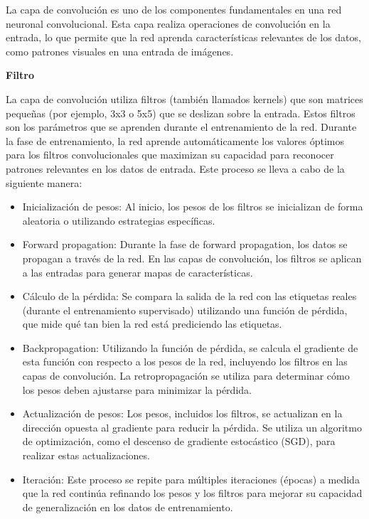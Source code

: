 La capa de convolución es uno de los componentes fundamentales en una red neuronal convolucional. Esta capa realiza operaciones de convolución en la entrada, lo que permite que la red aprenda características relevantes de los datos, como patrones visuales en una entrada de imágenes.

\textbf{Filtro}

La capa de convolución utiliza filtros (también llamados kernels) que son matrices pequeñas (por ejemplo, 3x3 o 5x5) que se deslizan sobre la entrada. Estos filtros son los parámetros que se aprenden durante el entrenamiento de la red. Durante la fase de entrenamiento, la red aprende automáticamente los valores óptimos para los filtros convolucionales que maximizan su capacidad para reconocer patrones relevantes en los datos de entrada. Este proceso se lleva a cabo de la siguiente manera:
 
 \begin{itemize}
	\item Inicialización de pesos: Al inicio, los pesos de los filtros se inicializan de forma aleatoria o utilizando estrategias específicas.
	
	\item Forward propagation: Durante la fase de forward propagation, los datos se propagan a través de la red. En las capas de convolución, los filtros se aplican a las entradas para generar mapas de características. 
	
	\item Cálculo de la pérdida: Se compara la salida de la red con las etiquetas reales (durante el entrenamiento supervisado) utilizando una función de pérdida, que mide qué tan bien la red está prediciendo las etiquetas.
	
	\item Backpropagation: Utilizando la función de pérdida, se calcula el gradiente de esta función con respecto a los pesos de la red, incluyendo los filtros en las capas de convolución. La retropropagación se utiliza para determinar cómo los pesos deben ajustarse para minimizar la pérdida.
	
	\item Actualización de pesos: Los pesos, incluidos los filtros, se actualizan en la dirección opuesta al gradiente para reducir la pérdida. Se utiliza un algoritmo de optimización, como el descenso de gradiente estocástico (SGD), para realizar estas actualizaciones.

	\item Iteración: Este proceso se repite para múltiples iteraciones (épocas) a medida que la red continúa refinando los pesos y los filtros para mejorar su capacidad de generalización en los datos de entrenamiento.
\end{itemize}

